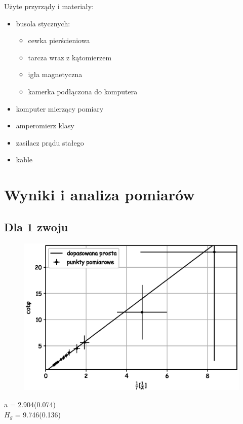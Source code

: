 \documentclass[a4paper,10pt]{article}
\begin{document}
Użyte przyrządy i materiały:
\begin{itemize}
  \item busola stycznych:
    \begin{itemize}
      \item cewka pierścieniowa
      \item tarcza wraz z kątomierzem
      \item igła magnetyczna
      \item kamerka podłączona do komputera
    \end{itemize}
  \item komputer mierzący pomiary
  \item amperomierz klasy %
  \item zasilacz prądu stałego
  \item kable
\end{itemize}

\section{Wyniki i analiza pomiarów}
\subsection{Dla 1 zwoju}

\begin{figure}[H]
  \includegraphics{./wykres_1.eps}
  \caption{}
  \label{}
\end{figure}
a = 2.904(0.074)\\
$H_g$ = 9.746(0.136)\\
\end{document}
